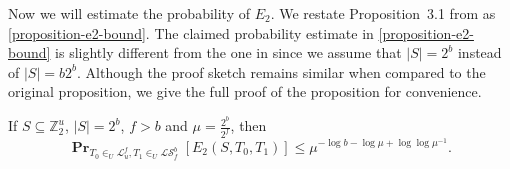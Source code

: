 \documentclass[unicode,review]{siamart1116}
\newcommand{\vecspace}[2]{\mathbb{Z}_{#1}^{#2}}
\newcommand{\binvecspace}[1]{\vecspace{2}{#1}}
\newcommand{\linearmaps}[2]{\mathcal{L}_{#1}^{#2}}
\newcommand{\surjectivelinearmaps}[2]{\mathcal{LS}_{#1}^{#2}}
\newcommand{\probs}[2]{\operatorname{\mathbf{Pr}}_{{#1}}\left[{#2}\right]}
\numberwithin{theorem}{section}
\begin{document}
Now we will estimate the probability of $E_2$.
We restate Proposition~3.1 from \cite{alonetal} as \cref{proposition-e2-bound}.
The claimed probability estimate in \cref{proposition-e2-bound} is slightly different from the one in \cite{alonetal} since we assume that $|S| = 2^b$ instead of $|S| = b2^b$.
Although the proof sketch remains similar when compared to the original proposition, we give the full proof of the proposition for convenience.

\begin{proposition}
\label{proposition-e2-bound}
If $S \subseteq \binvecspace{u}$, $|S| = 2^b$, $f > b$ and $\mu = \frac{2^b}{2^f}$, then
\[
\probs{T_0 \in_U \linearmaps{u}{f}, T_1 \in_U \surjectivelinearmaps{f}{b}}{E_2(S, T_0, T_1)} \leq \mu ^ {-\log b - \log \mu + \log \log \mu^{-1}}.
\]
\end{proposition}
\end{document}
